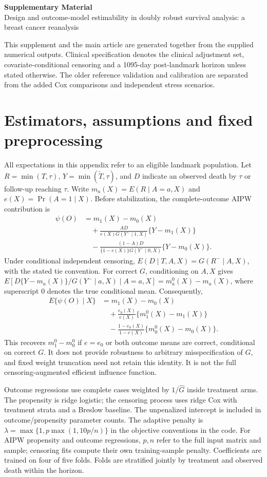 \documentclass[12pt,letterpaper]{article}
\begin{document}
\begin{center}\textbf{Supplementary Material}\\Design and outcome-model estimability in doubly robust survival analysis: a breast cancer reanalysis\end{center}
This supplement and the main article are generated together from the supplied numerical outputs.
Clinical specification denotes the clinical adjustment set, covariate-conditional censoring and a 1095-day
post-landmark horizon unless stated otherwise. The older reference validation and calibration are separated
from the added Cox comparisons and independent stress scenarios.

\section{Estimators, assumptions and fixed preprocessing}
All expectations in this appendix refer to an eligible landmark population. Let $R=\min(T,\tau)$,
$Y=\min(\widetilde T,\tau)$, and $D$ indicate an observed death by $\tau$ or follow-up reaching $\tau$.
Write $m_a(X)=E(R\mid A=a,X)$ and $e(X)=\Pr(A=1\mid X)$.
Before stabilization, the complete-outcome AIPW contribution is
\begin{align*}
\psi(O)&=m_1(X)-m_0(X)\\
&\quad+\frac{AD}{e(X)G(Y^-\mid 1,X)}\{Y-m_1(X)\}\\
&\quad-\frac{(1-A)D}{\{1-e(X)\}G(Y^-\mid 0,X)}\{Y-m_0(X)\}.
\end{align*}
Under conditional independent censoring, $E(D\mid T,A,X)=G(R^-\mid A,X)$, with the stated
tie convention. For correct $G$, conditioning on $A,X$ gives
$E[D\{Y-m_a(X)\}/G(Y^-\mid a,X)\mid A=a,X]=m_a^0(X)-m_a(X)$,
where superscript 0 denotes the true conditional mean. Consequently,
\begin{align*}
E\{\psi(O)\mid X\}&=m_1(X)-m_0(X)\\
&\quad+\frac{e_0(X)}{e(X)}\{m_1^0(X)-m_1(X)\}\\
&\quad-\frac{1-e_0(X)}{1-e(X)}\{m_0^0(X)-m_0(X)\}.
\end{align*}
This recovers $m_1^0-m_0^0$ if $e=e_0$ or both outcome means are correct, conditional on correct $G$.
It does not provide robustness to arbitrary misspecification of $G$, and fixed weight truncation need not
retain this identity. It is not the full censoring-augmented efficient influence function.

Outcome regressions use complete cases weighted by $1/\widehat G$ inside treatment arms.
The propensity is ridge logistic; the censoring process uses ridge Cox with treatment strata and a
Breslow baseline. The unpenalized intercept is included in outcome/propensity parameter counts.
The adaptive penalty is $\lambda=\max\{1,p\max(1,10p/n)\}$ in the objective conventions in the code.
For AIPW propensity and outcome regressions, $p,n$ refer to the full input matrix and sample;
censoring fits compute their own training-sample penalty. Coefficients are trained on four of five folds.
Folds are stratified jointly by treatment and observed death within the horizon.
\end{document}
